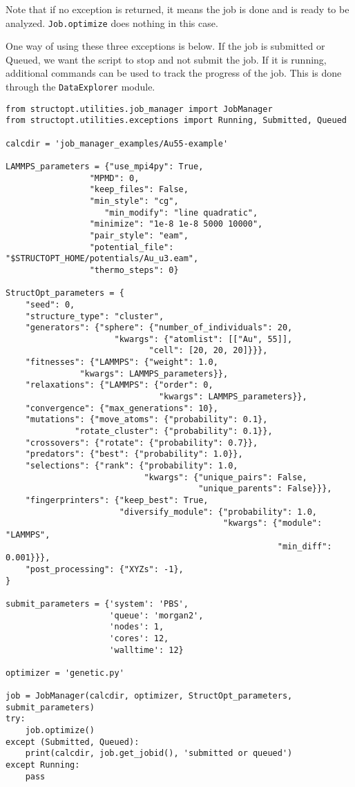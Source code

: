 \documentclass[11pt]{article}
\begin{document}
Note that if no exception is returned, it means the job is done and is ready to be analyzed. \texttt{Job.optimize} does nothing in this case.

One way of using these three exceptions is below. If the job is submitted or Queued, we want the script to stop and not submit the job. If it is running, additional commands can be used to track the progress of the job. This is done through the \texttt{DataExplorer} module.

\begin{verbatim}
from structopt.utilities.job_manager import JobManager
from structopt.utilities.exceptions import Running, Submitted, Queued

calcdir = 'job_manager_examples/Au55-example'

LAMMPS_parameters = {"use_mpi4py": True,
	             "MPMD": 0,
	             "keep_files": False,
	             "min_style": "cg",
                    "min_modify": "line quadratic",
	             "minimize": "1e-8 1e-8 5000 10000",
	             "pair_style": "eam",
	             "potential_file": "$STRUCTOPT_HOME/potentials/Au_u3.eam",
	             "thermo_steps": 0}

StructOpt_parameters = {
    "seed": 0,
    "structure_type": "cluster",
    "generators": {"sphere": {"number_of_individuals": 20,
		              "kwargs": {"atomlist": [["Au", 55]],
			                 "cell": [20, 20, 20]}}},
    "fitnesses": {"LAMMPS": {"weight": 1.0,
	           "kwargs": LAMMPS_parameters}},
    "relaxations": {"LAMMPS": {"order": 0,
                               "kwargs": LAMMPS_parameters}},
    "convergence": {"max_generations": 10},
    "mutations": {"move_atoms": {"probability": 0.1},
	          "rotate_cluster": {"probability": 0.1}},
    "crossovers": {"rotate": {"probability": 0.7}},
    "predators": {"best": {"probability": 1.0}},
    "selections": {"rank": {"probability": 1.0,
                            "kwargs": {"unique_pairs": False,
                                       "unique_parents": False}}},
    "fingerprinters": {"keep_best": True,
                       "diversify_module": {"probability": 1.0,
                                            "kwargs": {"module": "LAMMPS",
                                                       "min_diff": 0.001}}},
    "post_processing": {"XYZs": -1},
}

submit_parameters = {'system': 'PBS',
                     'queue': 'morgan2',
                     'nodes': 1,
                     'cores': 12,
                     'walltime': 12}

optimizer = 'genetic.py'

job = JobManager(calcdir, optimizer, StructOpt_parameters, submit_parameters)
try:
    job.optimize()
except (Submitted, Queued):
    print(calcdir, job.get_jobid(), 'submitted or queued')
except Running:
    pass
\end{verbatim}
\end{document}
